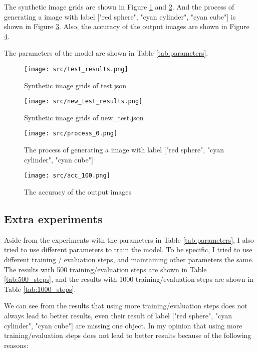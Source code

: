 The synthetic image grids are shown in Figure \ref{fig:synthetic_image_grids} and \ref{fig:synthetic_image_grids_new}.
And the process of generating a image with label ["red sphere", "cyan cylinder", "cyan cube"] is shown in Figure \ref{fig:process}.
Also, the accuracy of the output images are shown in Figure \ref{fig:accuracy_100}.

The parameters of the model are shown in Table \ref{tab:parameters}.

\begin{figure}[hb]
    \centering
    \texttt{[image: src/test\_results.png]}
    \caption{Synthetic image grids of test.json}
    \label{fig:synthetic_image_grids}
\end{figure}

\begin{figure}[hb]
    \centering
    \texttt{[image: src/new\_test\_results.png]}
    \caption{Synthetic image grids of new\_test.json}
    \label{fig:synthetic_image_grids_new}
\end{figure}

\begin{figure}[hb]
    \centering
    \texttt{[image: src/process\_0.png]}
    \caption{The process of generating a image with label ["red sphere", "cyan cylinder", "cyan cube"]}
    \label{fig:process}
\end{figure}

\begin{figure}[hb]
    \centering
    \texttt{[image: src/acc\_100.png]}
    \caption{The accuracy of the output images}
    \label{fig:accuracy_100}
\end{figure}

\subsection{Extra experiments}
Aside from the experiments with the parameters in Table \ref{tab:parameters}, I also tried to use different parameters to train the model.
To be specific, I tried to use different training / evaluation steps, and maintaining other parameters the same.
The results with 500 training/evaluation steps are shown in Table \ref{tab:500_steps}, and the results with 1000 training/evaluation steps are shown in Table \ref{tab:1000_steps}.

We can see from the results that using more training/evaluation steps does not always lead to better results, even their result of label ["red sphere", "cyan cylinder", "cyan cube"] are missing one object.
In my opinion that using more training/evaluation steps does not lead to better results because of the following reasons:

